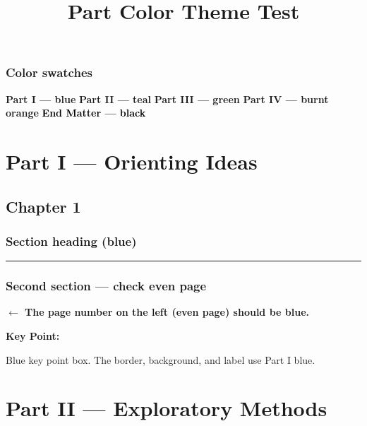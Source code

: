 \documentclass[
  twoside,
  10pt]{book}
\title{Part Color Theme Test}
\author{}
\date{}
\newcommand{\partrule}{%
  \textcolor{partcol}{\rule{\linewidth}{0.8pt}}}
\newenvironment{keypoint}{%
  \begin{mdframed}[style=keypointbox]%
  \textcolor{partcol}{\textbf{Key Point:}}\space
}{\end{mdframed}}
\begin{document}
\frontmatter
\maketitle


\mainmatter
\section{Color swatches}\label{color-swatches}

\medskip

\colorbox{partI!20}{\textcolor{partI}{\textbf{Part I — blue}}}
\colorbox{partII!20}{\textcolor{partII}{\textbf{Part II — teal}}}
\colorbox{partIII!20}{\textcolor{partIII}{\textbf{Part III — green}}}
\colorbox{partIV!20}{\textcolor{partIV}{\textbf{Part IV — burnt orange}}}
\colorbox{black!10}{\textcolor{black}{\textbf{End Matter — black}}}

\part{Part I — Orienting Ideas}

\chapter{Chapter 1}\label{chapter-1}

\section{Section heading (blue)}\label{section-heading-blue}

\partrule

\lipsum[1-4]

\section{Second section --- check even
page}\label{second-section-check-even-page}

\textbf{$\leftarrow$ The page number on the left (even page) should be blue.}

\lipsum[5-6]

\begin{keypoint}
Blue key point box. The border, background, and label use Part I blue.
\end{keypoint}

\part{Part II — Exploratory Methods}
\end{document}
